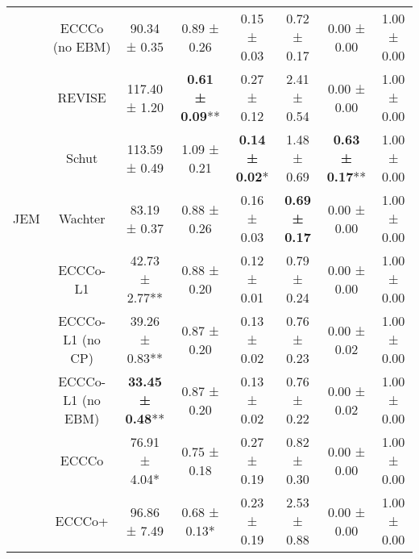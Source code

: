 \begin{table}
{\begin{tabular}[t]{cccccccc}
 & ECCCo (no EBM) & 90.34 ± 0.35\hphantom{*}\hphantom{*} & 0.89 ± 0.26\hphantom{*}\hphantom{*} & 0.15 ± 0.03\hphantom{*}\hphantom{*} & 0.72 ± 0.17\hphantom{*}\hphantom{*} & 0.00 ± 0.00\hphantom{*}\hphantom{*} & 1.00 ± 0.00\hphantom{*}\hphantom{*}\\

 & REVISE & 117.40 ± 1.20\hphantom{*}\hphantom{*} & \textbf{0.61 ± 0.09}** & 0.27 ± 0.12\hphantom{*}\hphantom{*} & 2.41 ± 0.54\hphantom{*}\hphantom{*} & 0.00 ± 0.00\hphantom{*}\hphantom{*} & 1.00 ± 0.00\hphantom{*}\hphantom{*}\\

 & Schut & 113.59 ± 0.49\hphantom{*}\hphantom{*} & 1.09 ± 0.21\hphantom{*}\hphantom{*} & \textbf{0.14 ± 0.02}*\hphantom{*} & 1.48 ± 0.69\hphantom{*}\hphantom{*} & \textbf{0.63 ± 0.17}** & 1.00 ± 0.00\hphantom{*}\hphantom{*}\\

\multirow[t]{-10}{*}{\centering\arraybackslash JEM} & Wachter & 83.19 ± 0.37\hphantom{*}\hphantom{*} & 0.88 ± 0.26\hphantom{*}\hphantom{*} & 0.16 ± 0.03\hphantom{*}\hphantom{*} & \textbf{0.69 ± 0.17}\hphantom{*}\hphantom{*} & 0.00 ± 0.00\hphantom{*}\hphantom{*} & 1.00 ± 0.00\hphantom{*}\hphantom{*}\\
\cmidrule{1-8}
 & ECCCo-L1 & 42.73 ± 2.77** & 0.88 ± 0.20\hphantom{*}\hphantom{*} & 0.12 ± 0.01\hphantom{*}\hphantom{*} & 0.79 ± 0.24\hphantom{*}\hphantom{*} & 0.00 ± 0.00\hphantom{*}\hphantom{*} & 1.00 ± 0.00\hphantom{*}\hphantom{*}\\

 & ECCCo-L1 (no CP) & 39.26 ± 0.83** & 0.87 ± 0.20\hphantom{*}\hphantom{*} & 0.13 ± 0.02\hphantom{*}\hphantom{*} & 0.76 ± 0.23\hphantom{*}\hphantom{*} & 0.00 ± 0.02\hphantom{*}\hphantom{*} & 1.00 ± 0.00\hphantom{*}\hphantom{*}\\

 & ECCCo-L1 (no EBM) & \textbf{33.45 ± 0.48}** & 0.87 ± 0.20\hphantom{*}\hphantom{*} & 0.13 ± 0.02\hphantom{*}\hphantom{*} & 0.76 ± 0.22\hphantom{*}\hphantom{*} & 0.00 ± 0.02\hphantom{*}\hphantom{*} & 1.00 ± 0.00\hphantom{*}\hphantom{*}\\

 & ECCCo & 76.91 ± 4.04*\hphantom{*} & 0.75 ± 0.18\hphantom{*}\hphantom{*} & 0.27 ± 0.19\hphantom{*}\hphantom{*} & 0.82 ± 0.30\hphantom{*}\hphantom{*} & 0.00 ± 0.00\hphantom{*}\hphantom{*} & 1.00 ± 0.00\hphantom{*}\hphantom{*}\\

 & ECCCo+ & 96.86 ± 7.49\hphantom{*}\hphantom{*} & 0.68 ± 0.13*\hphantom{*} & 0.23 ± 0.19\hphantom{*}\hphantom{*} & 2.53 ± 0.88\hphantom{*}\hphantom{*} & 0.00 ± 0.00\hphantom{*}\hphantom{*} & 1.00 ± 0.00\hphantom{*}\hphantom{*}\\


\end{tabular}}
\end{table}
